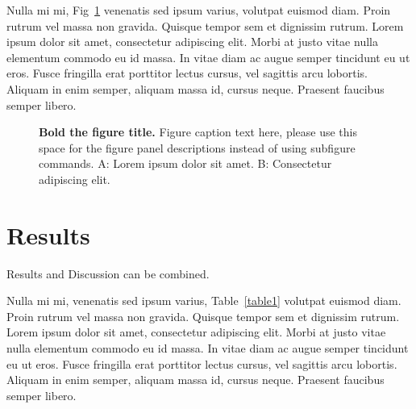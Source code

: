 \documentclass[
  10pt,
  letterpaper,
]{article}
\begin{document}
Nulla mi mi, Fig~\ref{fig1} venenatis sed ipsum varius, volutpat euismod
diam. Proin rutrum vel massa non gravida. Quisque tempor sem et
dignissim rutrum. Lorem ipsum dolor sit amet, consectetur adipiscing
elit. Morbi at justo vitae nulla elementum commodo eu id massa. In vitae
diam ac augue semper tincidunt eu ut eros. Fusce fringilla erat
porttitor lectus cursus, vel sagittis arcu lobortis. Aliquam in enim
semper, aliquam massa id, cursus neque. Praesent faucibus semper libero.

\begin{figure}[!h]
\caption{{\bf Bold the figure title.}
Figure caption text here, please use this space for the figure panel descriptions instead of using subfigure commands. A: Lorem ipsum dolor sit amet. B: Consectetur adipiscing elit.}
\label{fig1}
\end{figure}

\hypertarget{results}{%
\section{Results}\label{results}}

Results and Discussion can be combined.

Nulla mi mi, venenatis sed ipsum varius, Table~\ref{table1} volutpat
euismod diam. Proin rutrum vel massa non gravida. Quisque tempor sem et
dignissim rutrum. Lorem ipsum dolor sit amet, consectetur adipiscing
elit. Morbi at justo vitae nulla elementum commodo eu id massa. In vitae
diam ac augue semper tincidunt eu ut eros. Fusce fringilla erat
porttitor lectus cursus,  vel sagittis arcu lobortis.
Aliquam in enim semper, aliquam massa id, cursus neque. Praesent
faucibus semper libero.
\end{document}
